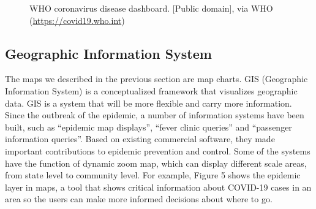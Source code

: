 \documentclass[sigplan,screen]{acmart}
\begin{document}
\begin{figure}[htb]
	\centering
	\caption{WHO coronavirus disease dashboard. [Public domain], via WHO (\url{https://covid19.who.int})}
\end{figure}

\subsection{Geographic Information System}
The maps we described in the previous section are map charts. GIS (Geographic Information System) is a conceptualized framework that visualizes geographic data.
GIS is a system that will be more flexible and carry more information.
Since the outbreak of the epidemic, a number of information systems have been built, such as ``epidemic map displays'', ``fever clinic queries'' and ``passenger information queries''.
Based on existing commercial software, they made important contributions to epidemic prevention and control\cite{zhou2020covid}.
Some of the systems have the function of dynamic zoom map, which can display different scale areas, from state level to community level. For example, Figure 5 shows the epidemic layer in maps, a tool that shows critical information about COVID-19 cases in an area so the users can make more informed decisions about where to go.
\end{document}
